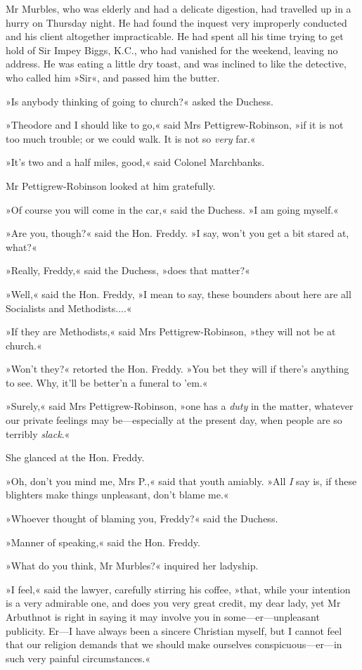 Mr Murbles, who was elderly and had a delicate digestion, had travelled up in a hurry on Thursday night. He had found the inquest very improperly conducted and his client altogether impracticable. He had spent all his time trying to get hold of Sir Impey Biggs, K.C., who had vanished for the weekend, leaving no address. He was eating a little dry toast, and was inclined to like the detective, who called him »Sir«, and passed him the butter.

»Is anybody thinking of going to church?« asked the Duchess.

»Theodore and I should like to go,« said Mrs Pettigrew-Robinson, »if it is not too much trouble; or we could walk. It is not so \textit{very} far.«

»It's two and a half miles, good,« said Colonel Marchbanks.

Mr Pettigrew-Robinson looked at him gratefully.

»Of course you will come in the car,« said the Duchess. »I am going myself.«

»Are you, though?« said the Hon. Freddy. »I say, won't you get a bit stared at, what?«

»Really, Freddy,« said the Duchess, »does that matter?«

»Well,« said the Hon. Freddy, »I mean to say, these bounders about here are all Socialists and Methodists....«

»If they are Methodists,« said Mrs Pettigrew-Robinson, »they will not be at church.«

»Won't they?« retorted the Hon. Freddy. »You bet they will if there's anything to see. Why, it'll be better'n a funeral to 'em.«

»Surely,« said Mrs Pettigrew-Robinson, »one has a \textit{duty} in the matter, whatever our private feelings may be—especially at the present day, when people are so terribly \textit{slack}.«

She glanced at the Hon. Freddy.

»Oh, don't you mind me, Mrs P.,« said that youth amiably. »All \textit{I} say is, if these blighters make things unpleasant, don't blame me.«

»Whoever thought of blaming you, Freddy?« said the Duchess.

»Manner of speaking,« said the Hon. Freddy.

»What do you think, Mr Murbles?« inquired her ladyship.

»I feel,« said the lawyer, carefully stirring his coffee, »that, while your intention is a very admirable one, and does you very great credit, my dear lady, yet Mr Arbuthnot is right in saying it may involve you in some—er—unpleasant publicity. Er—I have always been a sincere Christian myself, but I cannot feel that our religion demands that we should make ourselves conspicuous—er—in such very painful circumstances.«

